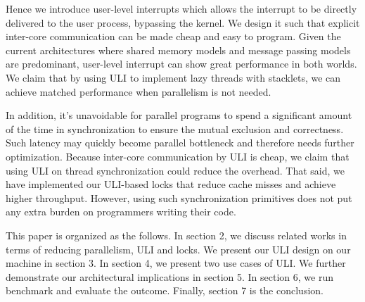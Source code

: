 Hence we introduce user-level interrupts which allows the interrupt to be directly delivered to the user process, bypassing the kernel. We design it such that explicit inter-core communication can be made cheap and easy to program. Given the current architectures where shared memory models and message passing models are predominant, user-level interrupt can show great performance in both worlds. We claim that by using ULI to implement lazy threads with stacklets, we can achieve matched performance when parallelism is not needed.

In addition, it's unavoidable for parallel programs to spend a significant amount of the time in synchronization to ensure the mutual exclusion and correctness. Such latency may quickly become parallel bottleneck and therefore needs further optimization. Because inter-core communication by ULI is cheap, we claim that using ULI on thread synchronization could reduce the overhead. That said, we have implemented our ULI-based locks that reduce cache misses and achieve higher throughput. However, using such synchronization primitives does not put any extra burden on programmers writing their code.

This paper is organized as the follows. In section 2, we discuss related works in terms of reducing parallelism, ULI and locks. We present our ULI design on our machine in section 3. In section 4, we present two use cases of ULI. We further demonstrate our architectural implications in section 5. In section 6, we run benchmark and evaluate the outcome. Finally, section 7 is the conclusion.

